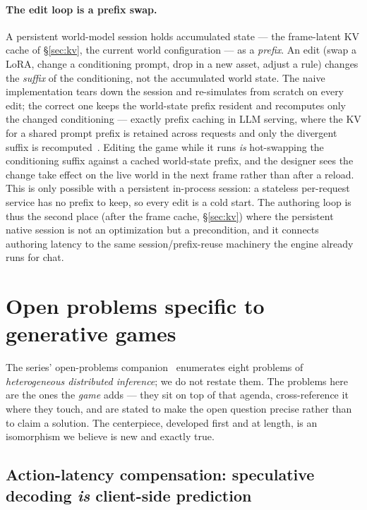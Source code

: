 \documentclass[11pt]{article}
\begin{document}
\paragraph{The edit loop is a prefix swap.} A persistent world-model session holds accumulated state --- the
frame-latent KV cache of \S\ref{sec:kv}, the current world configuration --- as a \emph{prefix}. An edit
(swap a LoRA, change a conditioning prompt, drop in a new asset, adjust a rule) changes the \emph{suffix} of
the conditioning, not the accumulated world state. The naive implementation tears down the session and
re-simulates from scratch on every edit; the correct one keeps the world-state prefix resident and recomputes
only the changed conditioning --- exactly prefix caching in LLM serving, where the KV for a shared prompt
prefix is retained across requests and only the divergent suffix is recomputed~\cite{latency}. Editing the game
while it runs \emph{is} hot-swapping the conditioning suffix against a cached world-state prefix, and the
designer sees the change take effect on the live world in the next frame rather than after a reload. This is
only possible with a persistent in-process session: a stateless per-request service has no prefix to keep, so
every edit is a cold start. The authoring loop is thus the second place (after the frame cache,
\S\ref{sec:kv}) where the persistent native session is not an optimization but a precondition, and it connects
authoring latency to the same session/prefix-reuse machinery the engine already runs for chat.

\section{Open problems specific to generative games}
\label{sec:open}

The series' open-problems companion~\cite{openproblems} enumerates eight problems of \emph{heterogeneous
distributed inference}; we do not restate them. The problems here are the ones the \emph{game} adds --- they
sit on top of that agenda, cross-reference it where they touch, and are stated to make the open question
precise rather than to claim a solution. The centerpiece, developed first and at length, is an isomorphism we
believe is new and exactly true.

\subsection{Action-latency compensation: speculative decoding \emph{is} client-side prediction}
\label{sec:spec}
\end{document}
